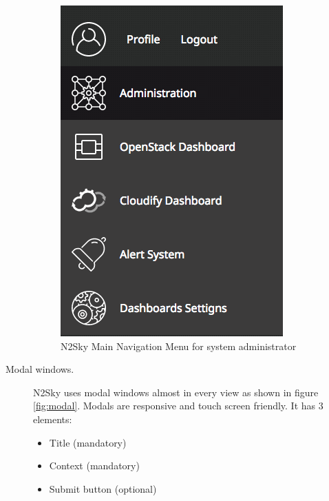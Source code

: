 \begin{description}
 \begin{figure}[H]
\begin{center}
  \includegraphics[scale=0.5]{components/3/components/menu_admin.png}
  \caption{N2Sky Main Navigation Menu for system administrator}
  \label{fig:menu_admin}
\end{center}
\end{figure}

\item[Modal windows.] N2Sky uses modal windows almost in every view as shown in figure \ref{fig:modal}. Modals are responsive and touch screen friendly. It has 3 elements:
\begin{itemize}
\item Title (mandatory)
\item Context (mandatory)
\item Submit button (optional)
\end{itemize}


\end{description}
